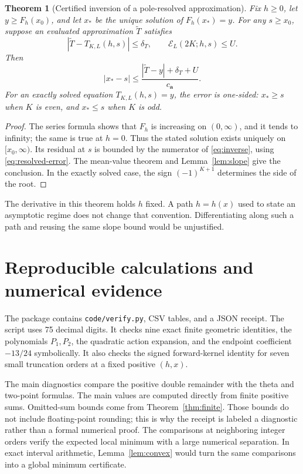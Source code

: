 \documentclass[11pt,a4paper]{article}
\numberwithin{equation}{section}
\newtheorem{theorem}{Theorem}[section]
\theoremstyle{definition}\newtheorem{definition}[theorem]{Definition}
\theoremstyle{remark}\newtheorem{remark}[theorem]{Remark}
\newcommand{\avec}{\boldsymbol a}
\newcommand{\calE}{\mathcal E}
\begin{document}
\begin{theorem}[Certified inversion of a pole-resolved approximation]
\label{thm:inverse}
Fix $h\ge0$, let $y\ge F_h(x_0)$, and let $x_*$ be the unique solution of
$F_h(x_*)=y$. For any $s\ge x_0$, suppose an evaluated approximation
$\widetilde T$ satisfies
\[
 |\widetilde T-T_{K,L}(h,s)|\le\delta_T,
 \qquad \calE_L(2K;h,s)\le U.
\]
Then
\begin{equation}
 |x_*-s|\le\frac{|\widetilde T-y|+\delta_T+U}{c_{\avec}}.
 \label{eq:inverse}
\end{equation}
For an exactly solved equation $T_{K,L}(h,s)=y$, the error is one-sided:
$x_*\ge s$ when $K$ is even, and $x_*\le s$ when $K$ is odd.
\end{theorem}
\begin{proof}
The series formula shows that $F_h$ is increasing on $(0,\infty)$, and
it tends to infinity; the same is true at $h=0$. Thus the stated solution
exists uniquely on $[x_0,\infty)$. Its residual at $s$ is bounded by the
numerator of \eqref{eq:inverse}, using \eqref{eq:resolved-error}. The
mean-value theorem and Lemma~\ref{lem:slope} give the conclusion. In the
exactly solved case, the sign $(-1)^{K+1}$ determines the side of the root.
\end{proof}

The derivative in this theorem holds $h$ fixed. A path $h=h(x)$ used to
state an asymptotic regime does not change that convention. Differentiating
along such a path and reusing the same slope bound would be unjustified.

\section{Reproducible calculations and numerical evidence}
\label{sec:numerics}

The package contains \texttt{code/verify.py}, CSV tables, and a JSON
receipt. The script uses 75 decimal digits. It checks nine exact finite
geometric identities, the polynomials $P_1,P_2$, the quadratic action
expansion, and the endpoint coefficient $-13/24$ symbolically. It also
checks the signed forward-kernel identity for seven small truncation
orders at a fixed positive $(h,x)$.

The main diagnostics compare the positive double remainder with the theta
and two-point formulas. The main values are computed directly from finite
positive sums. Omitted-sum bounds come from Theorem~\ref{thm:finite}.
Those bounds do not include floating-point rounding; this is why the
receipt is labeled a diagnostic rather than a formal numerical proof.
The comparisons at neighboring integer orders verify the expected local
minimum with a large numerical separation. In exact interval arithmetic,
Lemma~\ref{lem:convex} would turn the same comparisons into a global
minimum certificate.
\end{document}
